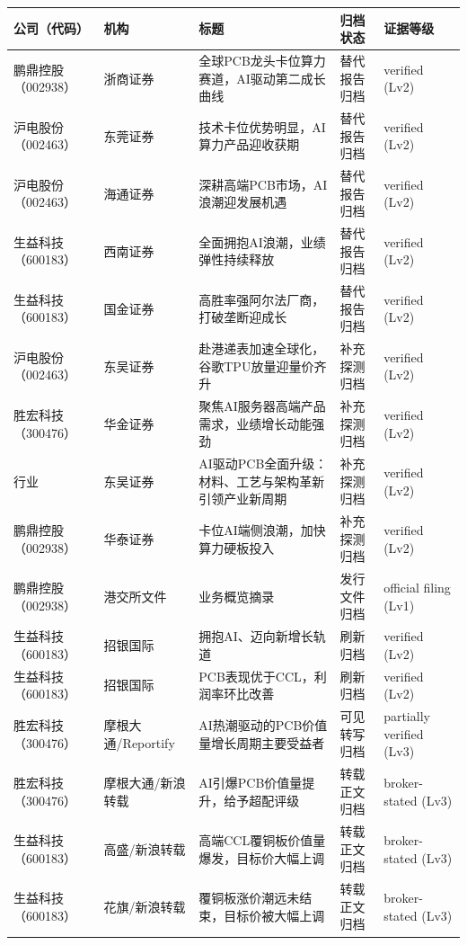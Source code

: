 \begin{exhibitbox}[表 12-4：全球投行缺口的替代归档与探测]
\footnotesize
\begin{tabularx}{\linewidth}{L{1.7cm}L{2.0cm}X L{2.4cm}L{3.6cm}}
\toprule
\textbf{公司（代码）} & \textbf{机构} & \textbf{标题} & \textbf{归档状态} & \textbf{证据等级} \\
\midrule
鹏鼎控股（002938） & 浙商证券 & 全球PCB龙头卡位算力赛道，AI驱动第二成长曲线 & 替代报告归档 & verified (Lv2) \\
沪电股份（002463） & 东莞证券 & 技术卡位优势明显，AI算力产品迎收获期 & 替代报告归档 & verified (Lv2) \\
沪电股份（002463） & 海通证券 & 深耕高端PCB市场，AI浪潮迎发展机遇 & 替代报告归档 & verified (Lv2) \\
生益科技（600183） & 西南证券 & 全面拥抱AI浪潮，业绩弹性持续释放 & 替代报告归档 & verified (Lv2) \\
生益科技（600183） & 国金证券 & 高胜率强阿尔法厂商，打破垄断迎成长 & 替代报告归档 & verified (Lv2) \\
沪电股份（002463） & 东吴证券 & 赴港递表加速全球化，谷歌TPU放量迎量价齐升 & 补充探测归档 & verified (Lv2) \\
胜宏科技（300476） & 华金证券 & 聚焦AI服务器高端产品需求，业绩增长动能强劲 & 补充探测归档 & verified (Lv2) \\
行业 & 东吴证券 & AI驱动PCB全面升级：材料、工艺与架构革新引领产业新周期 & 补充探测归档 & verified (Lv2) \\
鹏鼎控股（002938） & 华泰证券 & 卡位AI端侧浪潮，加快算力硬板投入 & 补充探测归档 & verified (Lv2) \\
鹏鼎控股（002938） & 港交所文件 & 业务概览摘录 & 发行文件归档 & official filing (Lv1) \\
生益科技（600183） & 招银国际 & 拥抱AI、迈向新增长轨道 & 刷新归档 & verified (Lv2) \\
生益科技（600183） & 招银国际 & PCB表现优于CCL，利润率环比改善 & 刷新归档 & verified (Lv2) \\
胜宏科技（300476） & 摩根大通/Reportify & AI热潮驱动的PCB价值量增长周期主要受益者 & 可见转写归档 & partially verified (Lv3) \\
胜宏科技（300476） & 摩根大通/新浪转载 & AI引爆PCB价值量提升，给予超配评级 & 转载正文归档 & broker-stated (Lv3) \\
生益科技（600183） & 高盛/新浪转载 & 高端CCL覆铜板价值量爆发，目标价大幅上调 & 转载正文归档 & broker-stated (Lv3) \\
生益科技（600183） & 花旗/新浪转载 & 覆铜板涨价潮远未结束，目标价被大幅上调 & 转载正文归档 & broker-stated (Lv3) \\

\end{tabularx}
\end{exhibitbox}
